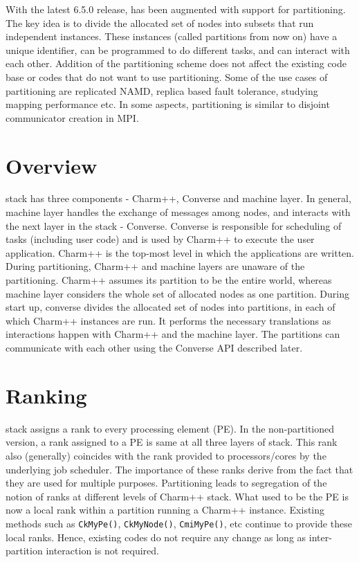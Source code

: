 With the latest 6.5.0 release, \charmpp has been augmented with support for 
partitioning. The key idea is to
divide the allocated set of nodes into subsets that run independent \charmpp
instances. These \charmpp instances (called partitions from now on) have a
unique identifier, can be programmed to do different tasks, and can interact
with each other. Addition of the partitioning scheme does not affect the
existing code base or codes that do not want to use partitioning. Some of the use
cases of partitioning are replicated NAMD, replica based fault tolerance,
studying mapping performance etc. In some aspects, partitioning is similar to 
disjoint communicator creation in MPI. 

\section{Overview}
\charmpp stack has three components - Charm++, Converse and machine layer. In
general, machine layer handles the exchange of messages among nodes, and
interacts with the next layer in the stack - Converse. Converse is responsible
for scheduling of tasks (including user code) and is used by Charm++ to execute
the user application. Charm++ is the top-most level in which the applications
are written. During partitioning, Charm++ and machine layers are unaware of
the partitioning. Charm++ assumes its partition to be the entire world, whereas
machine layer considers the whole set of allocated nodes as one partition.
During start up, converse divides the allocated set of nodes into partitions, in
each of which Charm++ instances are run. It performs the necessary translations
as interactions happen with Charm++ and the machine layer.  The partitions can 
communicate with each other using the Converse API described later.

\section{Ranking}
\charmpp stack assigns a rank to every processing element (PE). In the non-partitioned
version, a rank assigned to a PE is same at all three layers of \charmpp
stack. This rank also (generally) coincides with the rank provided to processors/cores 
by the underlying job scheduler. The importance of these ranks derive from the 
fact that they are used for multiple purposes. Partitioning leads to segregation of the 
notion of ranks at different levels of Charm++ stack. What used to be the PE is now a 
local rank within a partition running a Charm++ instance. Existing methods such as {\tt CkMyPe()},
{\tt CkMyNode()}, { \tt CmiMyPe()}, etc continue to provide these local ranks. Hence, existing 
codes do not require any change as long as inter-partition interaction is not required. 

